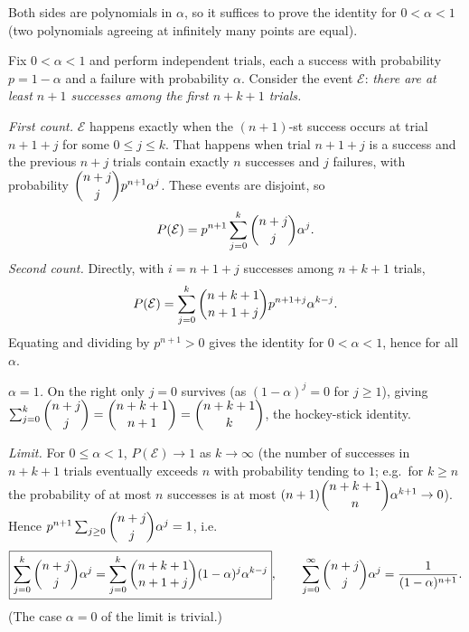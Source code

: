 Both sides are polynomials in $\alpha$, so it suffices to prove the identity for $0<\alpha<1$ (two polynomials agreeing at infinitely many points are equal).

Fix $0<\alpha<1$ and perform independent trials, each a success with probability $p=1-\alpha$ and a failure with probability $\alpha$. Consider the event $\mathcal E$: \emph{there are at least $n+1$ successes among the first $n+k+1$ trials.}

\emph{First count.} $\mathcal E$ happens exactly when the $(n+1)$-st success occurs at trial $n+1+j$ for some $0\le j\le k$. That happens when trial $n+1+j$ is a success and the previous $n+j$ trials contain exactly $n$ successes and $j$ failures, with probability $\dbinom{n+j}{j}p^{n+1}\alpha^j$. These events are disjoint, so
\[
P(\mathcal E)=p^{n+1}\sum_{j=0}^{k}\dbinom{n+j}{j}\alpha^j .
\]
\emph{Second count.} Directly, with $i=n+1+j$ successes among $n+k+1$ trials,
\[
P(\mathcal E)=\sum_{j=0}^{k}\dbinom{n+k+1}{n+1+j}p^{n+1+j}\alpha^{k-j}.
\]
Equating and dividing by $p^{n+1}>0$ gives the identity for $0<\alpha<1$, hence for all $\alpha$.

\emph{$\alpha=1$.} On the right only $j=0$ survives (as $(1-\alpha)^j=0$ for $j\ge1$), giving $\sum_{j=0}^k\dbinom{n+j}{j}=\dbinom{n+k+1}{n+1}=\dbinom{n+k+1}{k}$, the hockey-stick identity.

\emph{Limit.} For $0\le\alpha<1$, $P(\mathcal E)\to1$ as $k\to\infty$ (the number of successes in $n+k+1$ trials eventually exceeds $n$ with probability tending to $1$; e.g.\ for $k\ge n$ the probability of at most $n$ successes is at most $(n+1)\dbinom{n+k+1}{n}\alpha^{k+1}\to0$). Hence $p^{n+1}\sum_{j\ge0}\dbinom{n+j}{j}\alpha^j=1$, i.e.
\[
\boxed{\sum_{j=0}^{k}\dbinom{n+j}{j}\alpha^j=\sum_{j=0}^{k}\dbinom{n+k+1}{n+1+j}(1-\alpha)^j\alpha^{k-j}},\qquad \sum_{j=0}^{\infty}\dbinom{n+j}{j}\alpha^j=\dfrac{1}{(1-\alpha)^{n+1}}.
\]
(The case $\alpha=0$ of the limit is trivial.)
